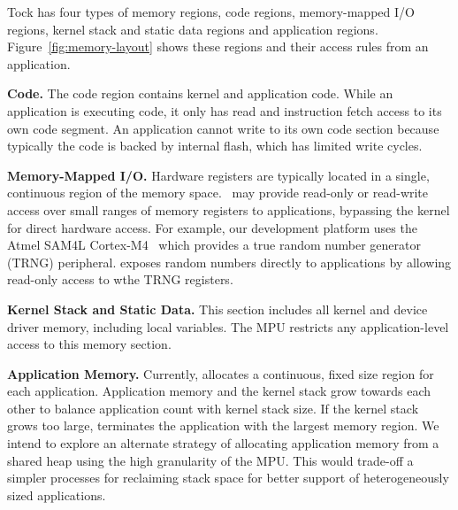 Tock has four types of memory regions, code regions, memory-mapped I/O regions,
kernel stack and static data regions and application regions.
Figure~\ref{fig:memory-layout} shows these regions and their access rules from
an application.

{\bf Code.}
The code region contains kernel and application code. While an application is
executing code, it only has read and instruction fetch access to its own code
segment. An application cannot write to its own code section because typically
the code is backed by internal flash, which has limited write cycles.

{\bf Memory-Mapped I/O.}
Hardware registers are typically located in a single, continuous region of the
memory space.~ \name may provide read-only or read-write
access over small ranges of memory registers to applications, bypassing the
kernel for direct hardware access. For example, our development platform uses
the Atmel SAM4L Cortex-M4~\cite{sam4l} which provides a true random number
generator (TRNG) peripheral. \name exposes random numbers directly to
applications by allowing read-only access to wthe TRNG registers.

{\bf Kernel Stack and Static Data.}
This section includes all kernel and device driver memory, including local
variables. The MPU restricts any application-level access to this memory section.

{\bf Application Memory.}
Currently, \name allocates a continuous, fixed size region for each
application.
Application memory and the kernel stack grow towards each other to balance
application count with kernel stack size. If the kernel stack
grows too large, \name terminates the application with the
largest memory region. We intend to explore an alternate strategy of
allocating application memory from a shared heap using the
high granularity of the MPU.
This would trade-off
a simpler processes for reclaiming stack space
for better support of heterogeneously sized applications.


